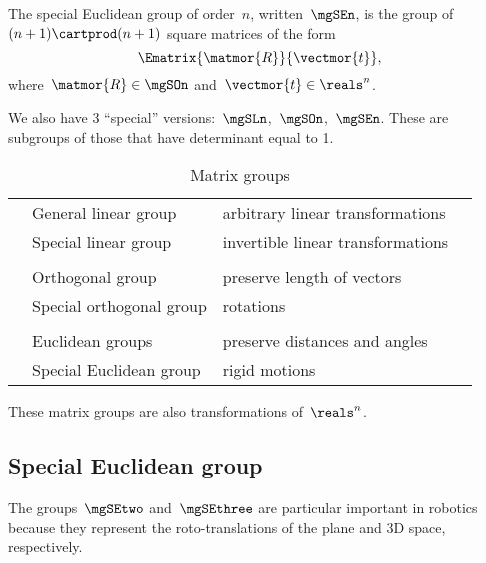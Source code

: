 \begin{definition}
	\label{def:special-euclidean-group}
	The special Euclidean group of order~$n$, written~$\mgSEn$, is the group of~$(n+1)\cartprod (n+1)$ square matrices of the form
	\begin{equation}
		\label{eq:SEn-def}
		\Ematrix{\matmor{R}}{\vectmor{t}},
	\end{equation}
	where~$\matmor{R}\in \mgSOn$ and~$\vectmor{t} \in \reals^n$.
\end{definition}


We also have 3 ``special'' versions:~$\mgSLn$,~$\mgSOn$,~$\mgSEn$.
These are subgroups of those that have determinant equal to 1.

\begin{table*}
	\caption{Matrix groups}
	\label{tab:matrix-groups}
	\begin{tabular}{cllc}
		\mgGLn & General linear group     & arbitrary linear transformations    \\
		\mgSLn & Special linear group     & invertible linear transformations   \\ \\
		\mgOn  & Orthogonal group         & preserve length of vectors          \\
		\mgSOn & Special orthogonal group & rotations                           \\ \\
		\mgEn  & Euclidean groups         & preserve distances and angles     & \\
		\mgSEn & Special Euclidean group  & rigid motions                       \\
	\end{tabular}
\end{table*}


These matrix groups are also transformations of~$\reals^n$.

\subsection{Special Euclidean group}

The groups~$\mgSEtwo$ and~$\mgSEthree$ are particular important in robotics because they represent the roto-translations of the plane and 3D space, respectively.

